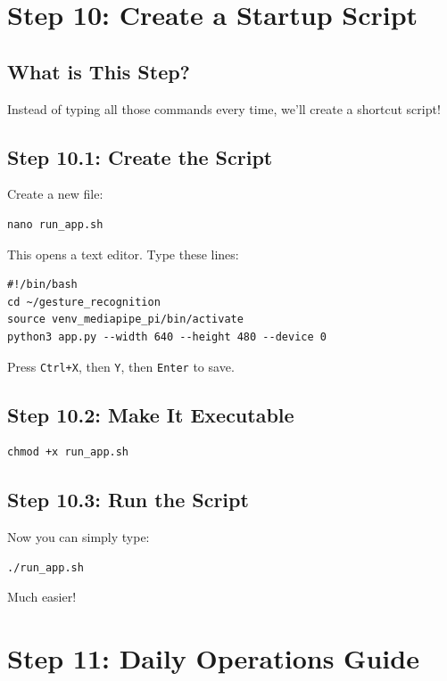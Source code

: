 \documentclass[12pt,a4paper]{article}
\begin{document}
\section{Step 10: Create a Startup Script}

\subsection{What is This Step?}

Instead of typing all those commands every time, we'll create a shortcut script!

\subsection{Step 10.1: Create the Script}

Create a new file:

\begin{lstlisting}
nano run_app.sh
\end{lstlisting}

This opens a text editor. Type these lines:

\begin{lstlisting}
#!/bin/bash
cd ~/gesture_recognition
source venv_mediapipe_pi/bin/activate
python3 app.py --width 640 --height 480 --device 0
\end{lstlisting}

Press \texttt{Ctrl+X}, then \texttt{Y}, then \texttt{Enter} to save.

\subsection{Step 10.2: Make It Executable}

\begin{lstlisting}
chmod +x run_app.sh
\end{lstlisting}

\subsection{Step 10.3: Run the Script}

Now you can simply type:

\begin{lstlisting}
./run_app.sh
\end{lstlisting}

Much easier!

\section{Step 11: Daily Operations Guide}
\end{document}
